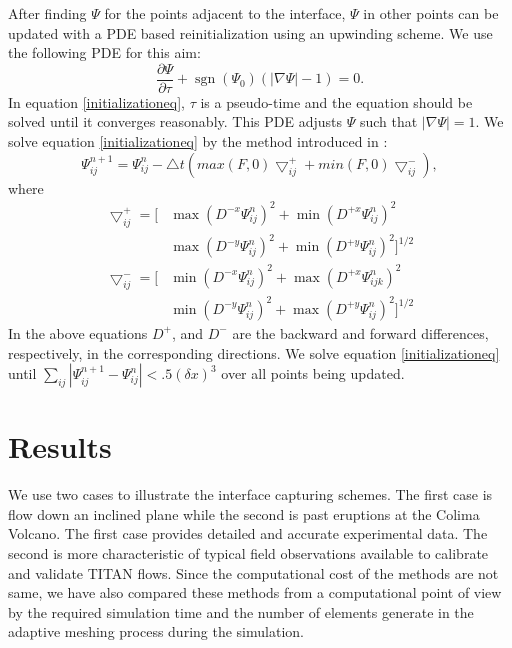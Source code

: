 \documentclass[review]{elsarticle}
\DeclareMathOperator{\sgn}{sgn}
\begin{document}
After finding $\varPsi$ for the points adjacent to the interface, $\varPsi$ in other points can be updated with a PDE based reinitialization using an upwinding scheme. 
We use the following PDE for this aim:
\begin{equation}\label{initializationeq}
        \frac{\partial \varPsi}{\partial \tau} + \sgn (\varPsi_0) (|\nabla \varPsi| - 1)= 0.
\end{equation}
In equation \eqref{initializationeq}, $\tau$ is a pseudo-time and the equation should be solved until it converges reasonably. This PDE adjusts $\varPsi$ such that $|\nabla \varPsi|=1$.
We solve equation \eqref{initializationeq} by the method introduced in \cite{Adalsteinsson1999}:
\begin{equation}
        \varPsi_{ij}^{n+1}=\varPsi_{ij}^{n}-\bigtriangleup t \left(max(F,0)\bigtriangledown_{ij}^{+}+min(F,0)\bigtriangledown_{ij}^{-} \right),
\end{equation}
where 
\begin{equation}
        \begin{aligned}
                \bigtriangledown_{ij}^{+} = \big[ & \max(D^{-x}\varPsi_{ij}^{n})^2 + \min(D^{+x}\varPsi_{ij}^{n})^2
                \\& \max(D^{-y}\varPsi_{ij}^{n})^2 + \min(D^{+y}\varPsi_{ij}^{n})^2 \big]^{1/2}
        \end{aligned}
\end{equation}
\begin{equation}
        \begin{aligned}
                \bigtriangledown_{ij}^{-} = \big[ & \min(D^{-x}\varPsi_{ij}^{n})^2 + \max(D^{+x}\varPsi_{ijk}^{n})^2
                \\& \min(D^{-y}\varPsi_{ij}^{n})^2 + \max(D^{+y}\varPsi_{ij}^{n})^2 \big]^{1/2}
        \end{aligned}
\end{equation} 
In the above equations $D^+$, and $D^-$ are the backward and forward differences, respectively, in the corresponding directions.
We solve equation \eqref{initializationeq} until $\sum\limits_{ij}|\varPsi_{ij}^{n+1} -\varPsi_{ij}^{n}| < .5 (\delta x)^3$ over all points being updated.

\section{Results} \label{results}
We use two cases to illustrate the  interface capturing schemes. The first case is flow down an inclined plane while the second is past eruptions at the Colima Volcano. 
The first case provides detailed and accurate  experimental data. The second is more characteristic of typical field observations available to calibrate and validate TITAN flows.
%
Since the computational cost of the methods are not same, we have also compared these methods from a computational point of view by the required simulation time and the number of elements generate in the adaptive meshing process
during the simulation. 
\end{document}
